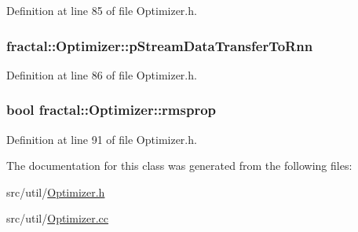 Definition at line 85 of file Optimizer.\+h.

\hypertarget{classfractal_1_1Optimizer_a8c8748626bbb8e1e304cc962f5b3697a}{
\subsubsection[{p\+Stream\+Data\+Transfer\+To\+Rnn}]{ fractal\+::\+Optimizer\+::p\+Stream\+Data\+Transfer\+To\+Rnn\hspace{0.3cm}{\ttfamily [protected]}}}\label{classfractal_1_1Optimizer_a8c8748626bbb8e1e304cc962f5b3697a}


Definition at line 86 of file Optimizer.\+h.

\hypertarget{classfractal_1_1Optimizer_a8724cfada07f856e1d69d53cf380ad13}{
\subsubsection[{rmsprop}]{\setlength{\rightskip}{0pt plus 5cm}bool fractal\+::\+Optimizer\+::rmsprop\hspace{0.3cm}{\ttfamily [protected]}}}\label{classfractal_1_1Optimizer_a8724cfada07f856e1d69d53cf380ad13}


Definition at line 91 of file Optimizer.\+h.



The documentation for this class was generated from the following files\+:\begin{DoxyCompactItemize}
\item 
src/util/\hyperlink{Optimizer_8h}{Optimizer.\+h}\item 
src/util/\hyperlink{Optimizer_8cc}{Optimizer.\+cc}\end{DoxyCompactItemize}
